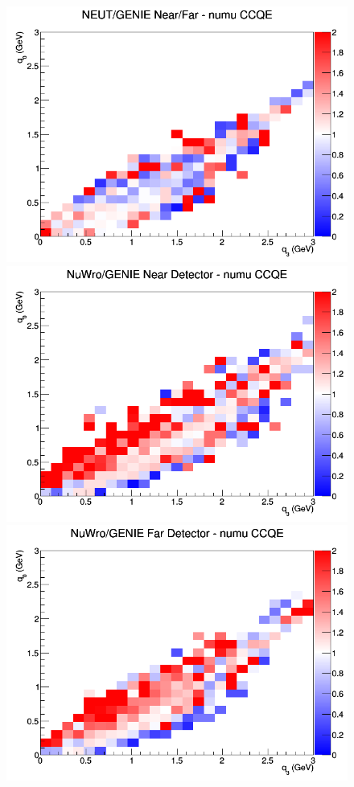 \begin{figure}[h]
\endminipage
{}
\includegraphics[width=\linewidth]{eff_q0_q3/FGT/ratios/CCQE_NEUT_GENIE_numu_NF_q3_q0.png}
\endminipage
\newline
{}
\includegraphics[width=\linewidth]{eff_q0_q3/FGT/ratios/CCQE_NuWro_GENIE_numu_near_q3_q0.png}
\endminipage
{}
\includegraphics[width=\linewidth]{eff_q0_q3/FGT/ratios/CCQE_NuWro_GENIE_numu_far_q3_q0.png}

\end{figure}
